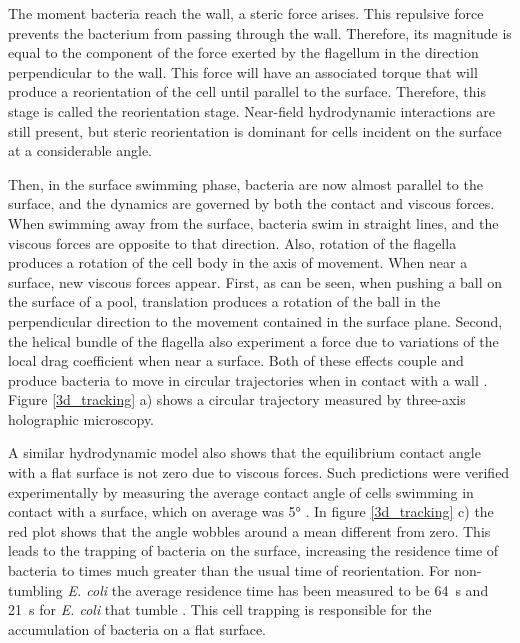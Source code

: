 The moment bacteria reach the wall, a steric force arises. This repulsive force prevents the bacterium from passing through the wall. Therefore, its magnitude is equal to the component of the force exerted by the flagellum in the direction perpendicular to the wall. This force will have an associated torque that will produce a reorientation of the cell until parallel to the surface. Therefore, this stage is called the reorientation stage. Near-field hydrodynamic interactions are still present, but steric reorientation is dominant for cells incident on the surface at a considerable angle.

Then, in the surface swimming phase, bacteria are now almost parallel to the surface, and the dynamics are governed by both the contact and viscous forces. When swimming away from the surface, bacteria swim in straight lines, and the viscous forces are opposite to that direction. Also, rotation of the flagella produces a rotation of the cell body in the axis of movement. When near a surface, new viscous forces appear. First, as can be seen, when pushing a ball on the surface of a pool, translation produces a rotation of the ball in the perpendicular direction to the movement contained in the surface plane. Second, the helical bundle of the flagella also experiment a force due to variations of the local drag coefficient when near a surface. Both of these effects couple and produce bacteria to move in circular trajectories when in contact with a wall \cite{Lauga2006SwimmingBoundaries}. Figure \ref{3d_tracking} a) shows a circular trajectory measured by three-axis holographic microscopy.

A similar hydrodynamic model also shows that the equilibrium contact angle with a flat surface is not zero due to viscous forces. Such predictions were verified experimentally by measuring the average contact angle of cells swimming in contact with a surface, which on average was \ang{5} \cite{Sipos2015HydrodynamicWalls}. In figure \ref{3d_tracking} c) the red plot shows that the angle wobbles around a mean different from zero. This leads to the trapping of bacteria on the surface, increasing the residence time of bacteria to times much greater than the usual time of reorientation. For non-tumbling \textit{E. coli} the average residence time has been measured to be \SI{64}{\second} \cite{Drescher2011FluidScattering} and  \SI{21}{\second} for \textit{E. coli} that tumble \cite{Junot2021Run-to-tumbleBacteria}. This cell trapping is responsible for the accumulation of bacteria on a flat surface.

